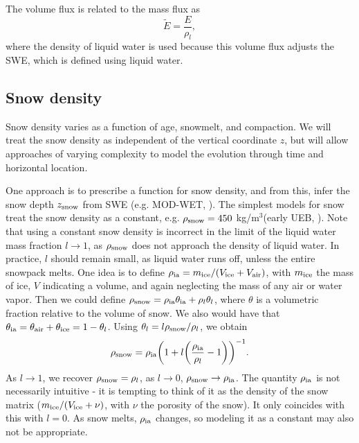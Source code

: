 \documentclass[twoside,10pt]{report}
\begin{document}
The volume flux is related to the mass flux as
\begin{equation}
    \tilde{E} = \frac{E}{\rho_l},
\end{equation}
where the density of liquid water is used because this volume flux adjusts the SWE, which is defined using liquid water. 


\subsection{Snow density}
Snow density varies as a function of age, snowmelt, and compaction. We will treat the snow density as independent of the vertical coordinate $z$, but will allow approaches of varying complexity to model the evolution through time and horizontal location.

One approach is to prescribe a function for snow density, and from this, infer the snow depth $z_{\rm snow}$ from SWE (e.g. MOD-WET, \citet{Margulis}). The simplest models for snow treat the snow density as a constant, e.g. $\rho_{\rm snow} = 450$ kg/m$^3$(early UEB, \citet{TarbotonLuce}).  Note that using a constant snow density is incorrect in the limit of the liquid water mass fraction $l \rightarrow 1$, as $\rho_{\rm snow}$ does not approach the density of liquid water. In practice, $l$ should remain small, as liquid water runs off, unless the entire snowpack melts. One idea is to define $\rho_{\rm ia} = m_{\rm ice}/(V_{\rm ice}+V_{\rm air})$, with $m_{\rm ice}$ the mass of ice, $V$ indicating a volume, and again neglecting the mass of any air or water vapor. Then we could define $\rho_{\rm snow} = \rho_{\rm ia}\theta_{\rm ia}+\rho_l\theta_l$, where $\theta$ is a volumetric fraction relative to the volume of snow. We also would have that $\theta_{\rm ia} = \theta_{\rm air}+\theta_{\rm ice} = 1-\theta_l$. Using $\theta_l = l\rho_{\rm snow}/\rho_l$, we obtain
\begin{equation}
    \rho_{\rm snow} = \rho_{\rm ia}\bigg(1+l\bigg( \frac{\rho_{\rm ia}}{\rho_l}-1\bigg) \bigg)^{-1}.
\end{equation}
As $l\rightarrow 1$, we recover $\rho_{\rm snow} = \rho_l$, as $l\rightarrow 0$, $\rho_{\rm snow}\rightarrow \rho_{\rm ia}$. The quantity $\rho_{\rm ia}$ is not necessarily intuitive - it is tempting to think of it as the density of the snow matrix ($m_{\rm ice}/(V_{\rm ice}+\nu)$, with $\nu$ the porosity of the snow). It only coincides with this with $l=0$. As snow melts, $\rho_{\rm ia}$ changes, so modeling it as a constant may also not be appropriate.
\end{document}
